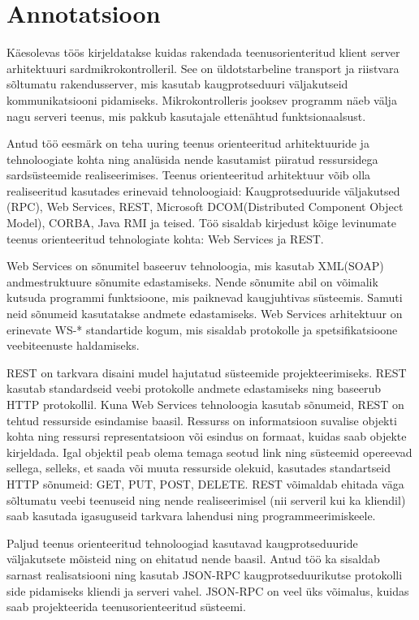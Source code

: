 \clearpage\vspace*{\fill}
\section*{Annotatsioon}
Käesolevas töös kirjeldatakse kuidas rakendada teenusorienteritud klient server arhitektuuri sardmikrokontrolleril.
See on üldotstarbeline transport ja riistvara sõltumatu rakendusserver,
mis kasutab kaugprotseduuri väljakutseid kommunikatsiooni pidamiseks.
Mikrokontrolleris jooksev programm näeb välja nagu serveri teenus,
mis pakkub kasutajale ettenähtud funktsionaalsust.

Antud töö eesmärk on teha uuring teenus orienteeritud arhitektuuride ja tehnoloogiate kohta 
ning analüsida nende kasutamist piiratud ressursidega sardsüsteemide realiseerimises. 
Teenus orienteeritud arhitektuur võib olla realiseeritud kasutades erinevaid tehnoloogiaid: 
Kaugprotseduuride väljakutsed (RPC),
Web Services,
REST,
Microsoft DCOM(Distributed Component Object Model),
CORBA,
Java RMI ja teised.
Töö sisaldab kirjedust kõige levinumate teenus orienteeritud tehnologiate kohta: Web Services ja REST.

Web Services on sõnumitel baseeruv tehnoloogia, mis kasutab XML(SOAP) andmestruktuure sõnumite edastamiseks. 
Nende sõnumite abil on võimalik kutsuda programmi funktsioone, mis paiknevad kaugjuhtivas süsteemis.
Samuti neid sõnumeid kasutatakse andmete edastamiseks. 
Web Services arhitektuur on erinevate WS-* standartide kogum, mis sisaldab protokolle ja spetsifikatsioone veebiteenuste haldamiseks.


REST on tarkvara disaini mudel hajutatud süsteemide projekteerimiseks. 
REST kasutab standardseid veebi protokolle andmete edastamiseks ning baseerub HTTP protokollil. 
Kuna Web Services tehnoloogia kasutab sõnumeid, REST on tehtud ressurside esindamise baasil. 
Ressurss on informatsioon suvalise objekti kohta ning ressursi representatsioon või esindus on formaat, kuidas saab objekte kirjeldada.
Igal objektil peab olema temaga seotud link ning süsteemid opereevad sellega, selleks, et saada või muuta ressurside olekuid, kasutades standartseid HTTP sõnumeid: GET, PUT, POST, DELETE.
REST võimaldab ehitada väga sõltumatu veebi teenuseid ning nende realiseerimisel (nii serveril kui ka kliendil) saab kasutada igasuguseid tarkvara lahendusi ning programmeerimiskeele.

Paljud teenus orienteeritud tehnoloogiad kasutavad kaugprotseduuride väljakutsete mõisteid ning on ehitatud nende baasil. 
Antud töö ka sisaldab sarnast realisatsiooni ning kasutab JSON-RPC kaugprotseduurikutse protokolli side pidamiseks kliendi ja serveri vahel.
JSON-RPC on veel üks võimalus, kuidas saab projekteerida teenusorienteeritud süsteemi.

